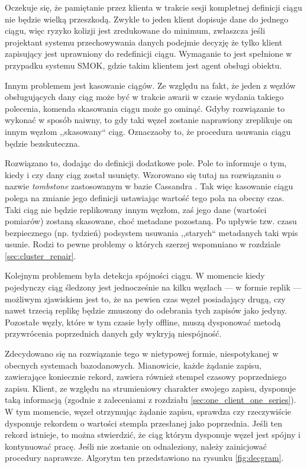 \documentclass[a4paper,polish,12pt,twoside]{article}
\begin{document}
Oczekuje się, że pamiętanie przez klienta w trakcie sesji kompletnej definicji ciągu nie będzie wielką przeszkodą. Zwykle to jeden klient dopisuje dane do jednego ciągu, więc ryzyko kolizji jest zredukowane do minimum, zwłaszcza jeśli projektant systemu przechowywania danych podejmie decyzję że tylko klient zapisujący jest uprawniony do redefinicji ciągu. Wymaganie to jest spełnione w przypadku systemu SMOK, gdzie takim klientem jest agent obsługi obiektu.

Innym problemem jest kasowanie ciągów. Ze względu na fakt, że jeden z węzłów obsługujących dany ciąg może być w trakcie awarii w czasie wydania takiego polecenia, komenda skasowania ciągu może go ominąć. Gdyby rozwiązanie to wykonać w sposób naiwny, to gdy taki węzeł zostanie naprawiony zreplikuje on innym węzłom ,,skasowany`` ciąg. Oznaczaoby to, że procedura usuwania ciągu będzie bezskuteczna. 

Rozwiązano to, dodając do definicji dodatkowe pole. Pole to informuje o tym, kiedy i czy dany ciąg został usunięty. Wzorowano się tutaj na rozwiązaniu o nazwie \textit{tombstone} zastosowanym w bazie Cassandra \cite{Lakshman:2010:CDS:1773912.1773922}. Tak więc kasowanie ciągu polega na zmianie jego definicji ustawiając wartość tego pola na obecny czas. Taki ciąg nie będzie replikowany innym węzłom, zaś jego dane (wartości pomiarów) zostaną skasowane, choć metadane pozostaną. Po upływie tzw. czasu bezpiecznego (np. tydzień) podsystem usuwania ,,starych`` metadanych taki wpis usunie. Rodzi to pewne problemy o których szerzej wspomniano w rozdziale \ref{sec:cluster_repair}.

Kolejnym problemem była detekcja spójności ciągu. W momencie kiedy pojedynczy ciąg śledzony jest jednocześnie na kilku węzłach --- w formie replik --- możliwym zjawiskiem jest to, że na pewien czas węzeł posiadający drugą, czy nawet trzecią replikę będzie zmuszony do odebrania tych zapisów jako jedyny. Pozostałe węzły, które w tym czasie były offline,  muszą dysponować metodą przywrócenia poprzednich danych gdy wykryją niespójność.

Zdecydowano się na rozwiązanie tego w nietypowej formie, niespotykanej w obecnych systemach bazodanowych. Mianowicie, każde żądanie zapisu, zawierające koniecznie rekord, zawiera również stempel czasowy poprzedniego zapisu. Klient, ze względu na strumieniowy charakter swojego zapisu, dysponuje taką informacją (zgodnie z zaleceniami z rozdziału \ref{sec:one_client_one_series}). W tym momencie, węzeł otrzymując żądanie zapisu, sprawdza czy rzeczywiście dysponuje rekordem o wartości stempla przesłanej jako poprzednia. Jeśli ten rekord istnieje, to można stwierdzić, że ciąg którym dysponuje węzeł jest spójny i kontynuować pracę. Jeśli nie zostanie on odnaleziony, należy zainicjować procedury naprawcze. Algorytm ten przedstawiono na rysunku \ref{fig:decgram}.
\end{document}
